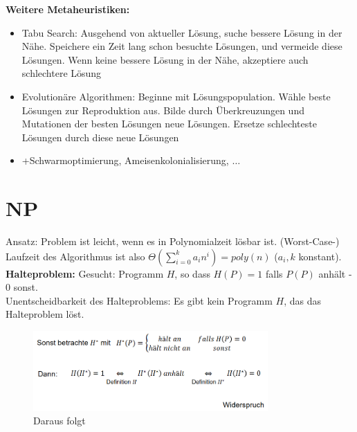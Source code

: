 \documentclass{article}
\begin{document}
            \newpage
            \textbf{Weitere Metaheuristiken:}
            \begin{itemize}
                \item Tabu Search: Ausgehend von aktueller Lösung, suche bessere Lösung in der Nähe. Speichere ein Zeit lang schon besuchte Lösungen, und vermeide diese Lösungen. Wenn keine bessere Lösung in der Nähe, akzeptiere auch schlechtere Lösung
                \item Evolutionäre Algorithmen: Beginne mit Lösungspopulation. Wähle beste Lösungen zur Reproduktion aus. Bilde durch Überkreuzungen und Mutationen der besten Lösungen neue Lösungen. Ersetze schlechteste Lösungen durch diese neue Lösungen
                \item +Schwarmoptimierung, Ameisenkolonialisierung, $\dots$
            \end{itemize}


    \newpage
    \section{NP}
        Ansatz: Problem ist leicht, wenn es in Polynomialzeit lösbar ist. (Worst-Case-) Laufzeit des Algorithmus ist also $\Theta (\sum_{i=0}^k a_in^i)=poly(n)$ ($a_i,k$ konstant).\\
        \textbf{Halteproblem:} Gesucht: Programm $H$, so dass $H(P)= 1$ falls $P(P)$ anhält - $0$ sonst.\\
        Unentscheidbarkeit des Halteproblems: Es gibt kein Programm $H$, das das Halteproblem löst.\\
        \begin{figure}[ht]
            \centering
            \includegraphics[width=0.8\textwidth]{Bilder/Halteproblem.png}
            \caption{Daraus folgt}
            \label{fig:Halteproblem}
        \end{figure}
\end{document}
